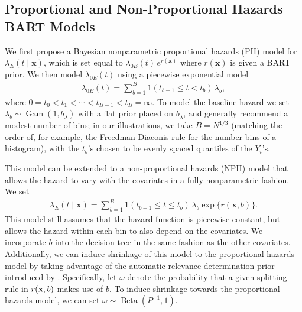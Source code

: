 \documentclass[12pt]{article}
\newcommand{\Beta}{\operatorname{Beta}}
\newcommand{\Gam}{\operatorname{Gam}}
\newcommand{\bx}{\mathbf{x}}
\newcommand{\bfx}{{\bf x}}
\begin{document}
\subsection{Proportional and Non-Proportional Hazards BART Models}

We first propose a Bayesian nonparametric proportional hazards (PH) model for
$\lambda_E(t \mid \bx)$, which is set equal to $\lambda_{0E}(t) \, e^{r(\bx)}$
where $r(\bx)$ is given a BART prior. We then model $\lambda_{0E}(t)$ using a
piecewise exponential model
\begin{align*}
  \lambda_{0E}(t) = \sum_{b=1}^B 1(t_{b-1} \le t < t_b) \, \lambda_b,  
\end{align*}
where $0 = t_0 < t_1 < \cdots < t_{B - 1} < t_B = \infty $. To model the baseline hazard we set $\lambda_b \sim \Gam(1, b_\lambda)$ with a flat prior placed on $b_\lambda$, and generally recommend a modest number of bins; in our illustrations, we take $B = N^{1/3}$ (matching the order of, for example, the Freedman-Diaconis rule for the number bins of a histogram), with the $t_b$'s chosen to be evenly spaced quantiles of the $Y_i$'s. 

This model can be extended to a non-proportional hazards (NPH) model that allows the hazard to vary with the covariates in a fully nonparametric fashion. We set
\begin{align*}
    \lambda_E(t \mid \bx)
    = \sum_{b = 1}^B 1(t_{b-1} \le t \le t_b) \, \lambda_b \exp\{r(\bx, b)\}.
\end{align*}
This model still assumes that the hazard function is piecewise constant, but allows the hazard within each bin to also depend on the covariates. We incorporate $b$ into the decision tree in the same fashion as the other covariates. Additionally, we can induce shrinkage of this model to the proportional hazards model by taking advantage of the automatic relevance determination prior introduced by \citet{linero2016bayesian}. Specifically, let $\omega$ denote the probability that a given splitting rule in $r(\bfx, b)$ makes use of $b$. To induce shrinkage towards the proportional hazards model, we can set $\omega \sim \Beta(P^{-1}, 1)$.
\end{document}
